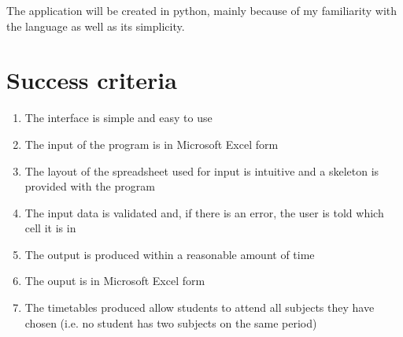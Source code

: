 \documentclass[a4paper, 12pt]{article}
\begin{document}
The application will be created in python, mainly because of my familiarity with the
language as well as its simplicity.

\section{Success criteria}

\begin{enumerate}
    \item The interface is simple and easy to use
    \item The input of the program is in Microsoft Excel form
    \item The layout of the spreadsheet used for input is intuitive and a skeleton is
        provided with the program
    \item The input data is validated and, if there is an error, the user is told which cell
        it is in
    \item The output is produced within a reasonable amount of time
    \item The ouput is in Microsoft Excel form
    \item The timetables produced allow students to attend all subjects they have chosen
        (i.e. no student has two subjects on the same period)
\end{enumerate}
\end{document}
